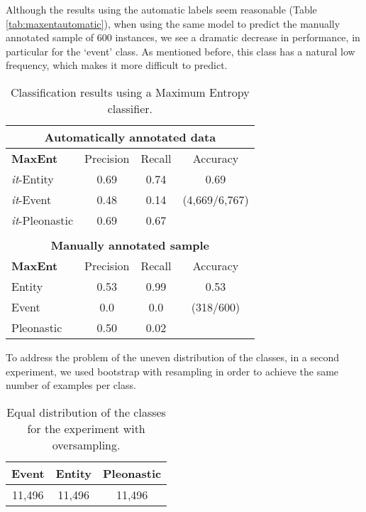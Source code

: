 \documentclass[10pt, a4paper]{article} \usepackage{lrec} \usepackage{multibib}
\begin{document}
 Although the results using the automatic labels seem reasonable (Table  \ref{tab:maxentautomatic}), when using the same model to predict the manually annotated sample of 600 instances, we see a dramatic decrease in performance, in particular for the `event' class. As mentioned before, this class has a natural low frequency, which makes it more difficult to predict. 

\begin{center} \begin{table}[h!]\centering 
\begin{tabular}{l ccc}
\multicolumn{4}{c}{ \textbf{Automatically annotated data}}\\ 
\toprule
\textbf{MaxEnt}& Precision & Recall & Accuracy \\ 
\midrule \textit{it}-Entity &
0.69 & 0.74 &   0.69\\ \textit{it}-Event & 0.48 & 0.14 & (4,669/6,767) \\
\textit{it}-Pleonastic & 0.69 & 0.67&   \\ 
\midrule & & & \\
\multicolumn{4}{c}{\textbf{Manually annotated sample}}  \\ 
\midrule
\textbf{MaxEnt}& Precision & Recall & Accuracy \\ 
\midrule Entity &0.53 & 0.99 &
0.53\\ Event &0.0 & 0.0 & (318/600)\\ Pleonastic & 0.50 & 0.02 & \\ 
\bottomrule
\end{tabular} \caption{Classification results using a Maximum Entropy
classifier.} 
\end{table}\label{tab:maxentautomatic}
\end{center}

To address the problem of the uneven distribution of the classes, in a second experiment, we used bootstrap with resampling in order to achieve the same number of examples per class. 

\begin{table}[h!]\centering
\begin{tabular}{ccc}
\toprule
\textbf{Event} & \textbf{Entity} & \textbf{Pleonastic} \\
\midrule
11,496 & 11,496 & 11,496 \\
\bottomrule
\end{tabular}
\caption{Equal distribution of the classes for the experiment with oversampling.}
\end{table}
\end{document}
